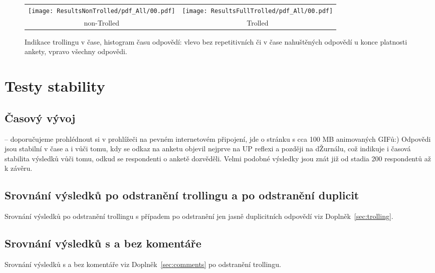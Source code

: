 \documentclass[a4paper,twoside]{article}
\begin{document}
\begin{figure}[!h]
\begin{tabular}{cc}
{  \texttt{[image: ResultsNonTrolled/pdf\_All/00.pdf]} } & 
{  \texttt{[image: ResultsFullTrolled/pdf\_All/00.pdf]}} \\
 non-Trolled & Trolled \\

\end{tabular}
\caption{Indikace trollingu v čase, histogram času odpovědí: vlevo bez repetitivních či v čase nahuštěných odpovědí u konce platnosti ankety, vpravo všechny odpovědi.}
\label{fig:troll_indication}
\end{figure}


\section{Testy stability}

\subsection{Časový vývoj}
 -- doporučujeme prohlédnout si v prohlížeči na pevném internetovém připojení, jde o stránku s cca 100 MB animovaných GIFů:) Odpovědi jsou stabilní v čase a i vůči tomu, kdy se odkaz na anketu objevil nejprve na UP reflexi a později na dŽurnálu, což indikuje i časová stabilita výsledků vůči tomu, odkud se respondenti o anketě dozvěděli. Velmi podobné výsledky jsou znát již od stadia 200 respondentů až k závěru.

\subsection{Srovnání výsledků po odstranění trollingu a po odstranění duplicit}
Srovnání výsledků po odstranění trollingu s případem po odstranění jen jasně duplicitních odpovědí viz Doplněk~\ref{sec:trolling}.

\subsection{Srovnání výsledků s a bez komentáře}
Srovnání výsledků s a bez komentáře viz Doplněk~\ref{sec:comments} po odstranění trollingu.
\end{document}
